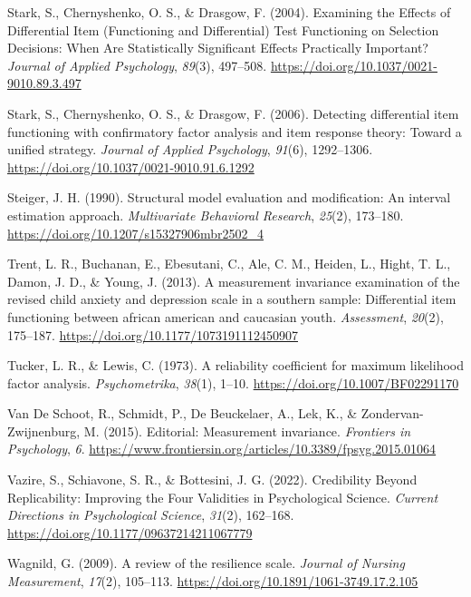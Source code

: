 \documentclass[
  man]{apa7}
\newlength{\cslhangindent}
\newenvironment{CSLReferences}[2] %
 {\begin{list}{}{%
  \setlength{\itemindent}{0pt}
  \setlength{\leftmargin}{0pt}
  \setlength{\parsep}{0pt}
  \ifodd #1
   \setlength{\leftmargin}{\cslhangindent}
   \setlength{\itemindent}{-1\cslhangindent}
  \fi
  \setlength{\itemsep}{#2\baselineskip}}}
 {\end{list}}
\begin{document}
\begin{CSLReferences}{1}{0}
Stark, S., Chernyshenko, O. S., \& Drasgow, F. (2004). Examining the Effects of Differential Item (Functioning and Differential) Test Functioning on Selection Decisions: When Are Statistically Significant Effects Practically Important? \emph{Journal of Applied Psychology}, \emph{89}(3), 497--508. \url{https://doi.org/10.1037/0021-9010.89.3.497}

Stark, S., Chernyshenko, O. S., \& Drasgow, F. (2006). Detecting differential item functioning with confirmatory factor analysis and item response theory: Toward a unified strategy. \emph{Journal of Applied Psychology}, \emph{91}(6), 1292--1306. \url{https://doi.org/10.1037/0021-9010.91.6.1292}

Steiger, J. H. (1990). Structural model evaluation and modification: An interval estimation approach. \emph{Multivariate Behavioral Research}, \emph{25}(2), 173--180. \url{https://doi.org/10.1207/s15327906mbr2502_4}

Trent, L. R., Buchanan, E., Ebesutani, C., Ale, C. M., Heiden, L., Hight, T. L., Damon, J. D., \& Young, J. (2013). A measurement invariance examination of the revised child anxiety and depression scale in a southern sample: Differential item functioning between african american and caucasian youth. \emph{Assessment}, \emph{20}(2), 175--187. \url{https://doi.org/10.1177/1073191112450907}

Tucker, L. R., \& Lewis, C. (1973). A reliability coefficient for maximum likelihood factor analysis. \emph{Psychometrika}, \emph{38}(1), 1--10. \url{https://doi.org/10.1007/BF02291170}

Van De Schoot, R., Schmidt, P., De Beuckelaer, A., Lek, K., \& Zondervan-Zwijnenburg, M. (2015). Editorial: Measurement invariance. \emph{Frontiers in Psychology}, \emph{6}. \url{https://www.frontiersin.org/articles/10.3389/fpsyg.2015.01064}

Vazire, S., Schiavone, S. R., \& Bottesini, J. G. (2022). Credibility Beyond Replicability: Improving the Four Validities in Psychological Science. \emph{Current Directions in Psychological Science}, \emph{31}(2), 162--168. \url{https://doi.org/10.1177/09637214211067779}

Wagnild, G. (2009). A review of the resilience scale. \emph{Journal of Nursing Measurement}, \emph{17}(2), 105--113. \url{https://doi.org/10.1891/1061-3749.17.2.105}


\end{CSLReferences}
\end{document}

